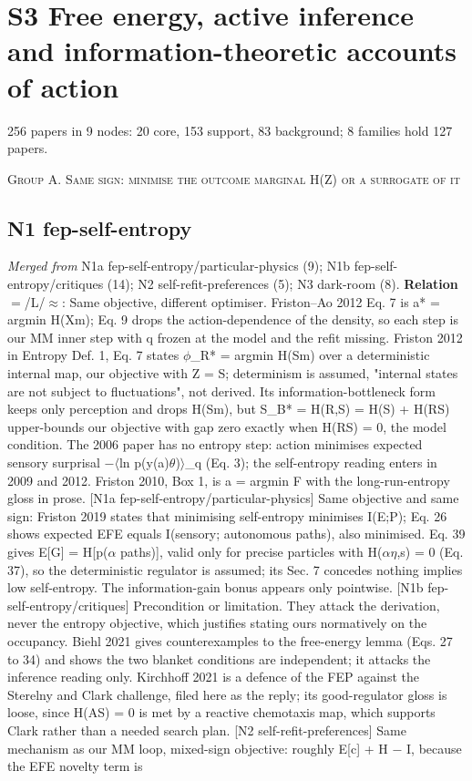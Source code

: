 \documentclass[10pt]{article}
\begin{document}
\section{S3 Free energy, active inference and information-theoretic accounts of action}
256 papers in 9 nodes: 20 core, 153 support, 83 background; 8 families hold 127 papers.

\medskip\textsc{Group A. Same sign: minimise the outcome marginal H(Z) or a surrogate of it}

\subsection{N1 fep-self-entropy}\label{node:S3-N1-fep-self-entropy}
\textit{Merged from} N1a fep-self-entropy/particular-physics (9); N1b fep-self-entropy/critiques (14); N2 self-refit-preferences (5); N3 dark-room (8). \textbf{Relation} $=$/\textsf{L}/$\approx$: Same objective, different optimiser. Friston--Ao 2012 \citep{Friston-free12b} Eq. 7 is a* = argmin H(X\textbar{}m); Eq. 9 drops the action-dependence of the density, so each step is our MM inner step with q frozen at the model and the refit missing. Friston 2012 in Entropy \citep{Friston-free12c} Def. 1, Eq. 7 states \ensuremath{\phi}\_R* = argmin H(S\textbar{}m) over a deterministic internal map, our objective with Z = S; determinism is assumed, "internal states are not subject to fluctuations", not derived. Its information-bottleneck form keeps only perception and drops H(S\textbar{}m), but S\_B* = H(R,S) = H(S) + H(R\textbar{}S) upper-bounds our objective with gap zero exactly when H(R\textbar{}S) = 0, the model condition. The 2006 paper has no entropy step: action minimises expected sensory surprisal \ensuremath{-}\ensuremath{\langle}ln p(y(a)\textbar{}\ensuremath{\theta})\ensuremath{\rangle}\_q (Eq. 3); the self-entropy reading enters in 2009 and 2012. Friston 2010, Box 1, is a = argmin F with the long-run-entropy gloss in prose. [N1a fep-self-entropy/particular-physics] Same objective and same sign: Friston 2019 states that minimising self-entropy minimises I(E;P); \citet{Friston-path23} Eq. 26 shows expected EFE equals I(sensory; autonomous paths), also minimised. \citet{Friston-free23} Eq. 39 gives E[G] = H[p(\ensuremath{\alpha} paths)], valid only for precise particles with H(\ensuremath{\alpha}\textbar{}\ensuremath{\eta},s) = 0 (Eq. 37), so the deterministic regulator is assumed; its Sec. 7 concedes nothing implies low self-entropy. The information-gain bonus appears only pointwise. [N1b fep-self-entropy/critiques] Precondition or limitation. They attack the derivation, never the entropy objective, which justifies stating ours normatively on the occupancy. Biehl 2021 gives counterexamples to the free-energy lemma (Eqs. 27 to 34) and shows the two blanket conditions are independent; it attacks the inference reading only. Kirchhoff 2021 is a defence of the FEP against the Sterelny and Clark challenge, filed here as the reply; its good-regulator gloss is loose, since H(A\textbar{}S) = 0 is met by a reactive chemotaxis map, which supports Clark rather than a needed search plan. [N2 self-refit-preferences] Same mechanism as our MM loop, mixed-sign objective: roughly E[c] + H \ensuremath{-} I, because the EFE novelty term is 
\end{document}

